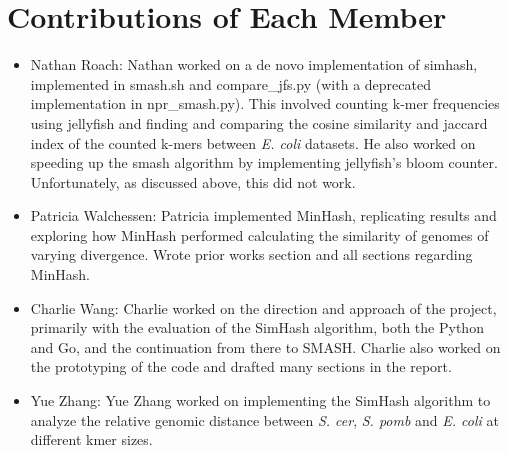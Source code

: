 \documentclass[12pt, letterpaper]{article}
\begin{document}
\section{Contributions of Each Member}
\begin{itemize}
\item Nathan Roach: Nathan worked on a de novo implementation of simhash, implemented in smash.sh and compare\_jfs.py (with a deprecated implementation in npr\_smash.py). This involved counting k-mer frequencies using jellyfish and finding and comparing the cosine similarity and jaccard index of the counted k-mers between \textit{E. coli} datasets. He also worked on speeding up the smash algorithm by implementing jellyfish's bloom counter. Unfortunately, as discussed above, this did not work.
\item Patricia Walchessen: Patricia implemented MinHash, replicating results and exploring how MinHash performed calculating the similarity of genomes of varying divergence. Wrote prior works section and all sections regarding MinHash.
\item Charlie Wang: Charlie worked on the direction and approach of the project, primarily with the evaluation of the SimHash algorithm, both the Python and Go, and the continuation from there to SMASH. Charlie also worked on the prototyping of the code and drafted many sections in the report. 
\item Yue Zhang: Yue Zhang worked on implementing the SimHash algorithm to analyze the relative genomic distance between \textit{S. cer}, \textit{S. pomb} and \textit{E. coli} at different kmer sizes.
\end{itemize}
\end{document}
